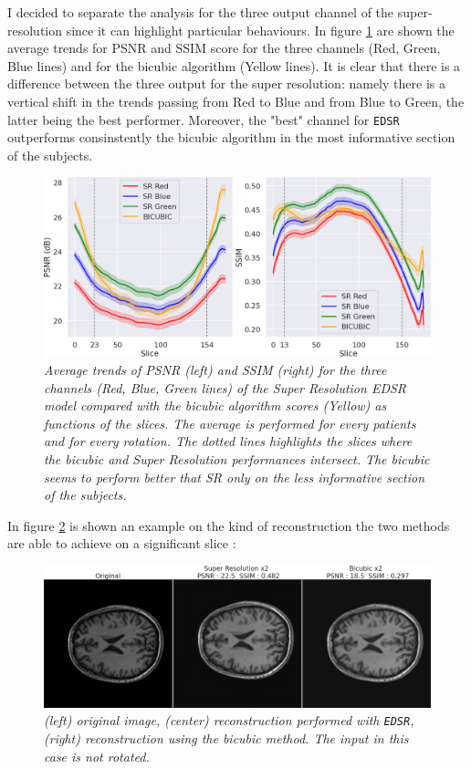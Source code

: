 \documentclass[12pt,a4paper]{report}
\begin{document}
I decided to separate the analysis for the three output channel of the super-resolution since it can highlight particular behaviours. 
In figure \ref{fig:edsr-score-slide} are shown the average trends for PSNR and SSIM score for the three channels (Red, Green, Blue lines) and for the bicubic algorithm (Yellow lines). 
It is clear that there is a difference between the three output for the super resolution: namely there is a vertical shift in the trends passing from Red to Blue and from Blue to Green, the latter being the best performer.
Moreover, the "best" channel for {\tt EDSR} outperforms consinstently the bicubic algorithm in the most informative section of the subjects.

\begin{figure}[H]
  \includegraphics[scale=0.37]{./images/edsr_score_slide.png}
  \caption{\it Average trends of PSNR (left) and SSIM (right) for the three channels (Red, Blue, Green lines) of the Super Resolution EDSR model compared with the bicubic algorithm scores (Yellow) as functions of the slices. The average is performed for every patients and for every rotation. The dotted lines highlights the slices where the bicubic and Super Resolution performances intersect. The bicubic seems to perform better that SR only on the less informative section of the subjects.}
  \label{fig:edsr-score-slide}
\end{figure}

In figure \ref{fig:edsr-upscale} is shown an example on the kind of reconstruction the two methods are able to achieve on a significant slice : 

\begin{figure}[H]
 \centering
 \includegraphics[scale=0.3]{./images/edsr-comp-images.png}
 \caption{\it (left) original image, (center) reconstruction performed with {\tt EDSR}, (right) reconstruction using the bicubic method. The input in this case is not rotated.}
 \label{fig:edsr-upscale}
\end{figure}
\end{document}
